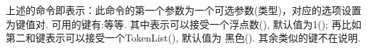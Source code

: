 上述的\cmd{\Polygon}命令即表示：此命令的第一个参数为一个可选参数(类型)，对应的选项设置为键值对.
可用的键有:等等. 
其中表示可以接受一个浮点数(), 默认值为1(); 
再比如第二和键表示可以接受一个TokenList(), 默认值为
黑色(). 其余类似的键不在说明.